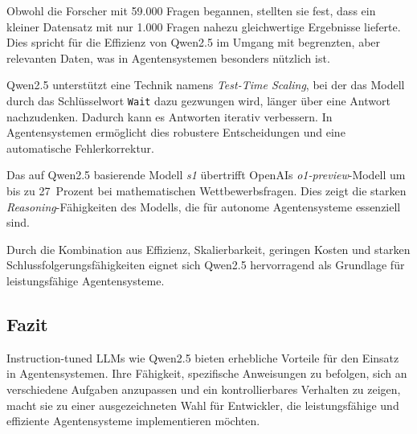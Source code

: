  Obwohl die Forscher mit 59.000 Fragen begannen, stellten sie fest, dass ein kleiner Datensatz mit nur 1.000 Fragen nahezu gleichwertige Ergebnisse lieferte. Dies spricht für die Effizienz von Qwen2.5 im Umgang mit begrenzten, aber relevanten Daten, was in Agentensystemen besonders nützlich ist.
 
 Qwen2.5 unterstützt eine Technik namens \emph{Test-Time Scaling}, bei der das Modell durch das Schlüsselwort \texttt{Wait} dazu gezwungen wird, länger über eine Antwort nachzudenken. Dadurch kann es Antworten iterativ verbessern. In Agentensystemen ermöglicht dies robustere Entscheidungen und eine automatische Fehlerkorrektur.
 
 Das auf Qwen2.5 basierende Modell \emph{s1} übertrifft OpenAIs \emph{o1-preview}-Modell um bis zu 27~Prozent bei mathematischen Wettbewerbsfragen. Dies zeigt die starken \emph{Reasoning}-Fähigkeiten des Modells, die für autonome Agentensysteme essenziell sind.
 
 Durch die Kombination aus Effizienz, Skalierbarkeit, geringen Kosten und starken Schlussfolgerungsfähigkeiten eignet sich Qwen2.5 hervorragend als Grundlage für leistungsfähige Agentensysteme.


\subsection{Fazit}

Instruction-tuned LLMs wie Qwen2.5 bieten erhebliche Vorteile für den Einsatz in Agentensystemen. Ihre Fähigkeit, spezifische Anweisungen zu befolgen, sich an verschiedene Aufgaben anzupassen und ein kontrollierbares Verhalten zu zeigen, macht sie zu einer ausgezeichneten Wahl für Entwickler, die leistungsfähige und effiziente Agentensysteme implementieren möchten.